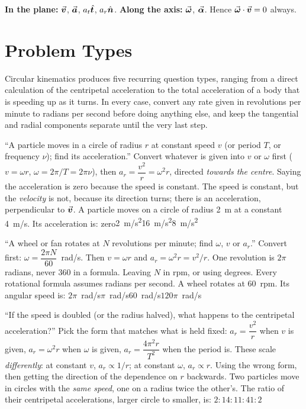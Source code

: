 \medskip
\textbf{In the plane:} $\vec{\bm{v}}$, $\vec{\bm{a}}$, $a_t\hat{\bm{t}}$, $a_r\hat{\bm{n}}$. \quad
\textbf{Along the axis:} $\vec{\bm{\omega}}$, $\vec{\bm{\alpha}}$. \quad
Hence $\vec{\bm{\omega}}\cdot\vec{\bm{v}}=0$ always.

\section{Problem Types}\label{sec:types6}
Circular kinematics produces five recurring question types, ranging from a direct calculation of the
centripetal acceleration to the total acceleration of a body that is speeding up as it turns. In every
case, convert any rate given in revolutions per minute to radians per second before doing anything else,
and keep the tangential and radial components separate until the very last step.

{``A particle moves in a circle of radius $r$ at constant speed $v$ (or period $T$, or frequency
$\nu$); find its acceleration.''}
{Convert whatever is given into $v$ or $\omega$ first ($v=\omega r$, $\omega=2\pi/T=2\pi\nu$), then
$a_r=\dfrac{v^2}{r}=\omega^2 r$, directed \emph{towards the centre}.}
{Saying the acceleration is zero because the speed is constant. The speed is constant, but the
\emph{velocity} is not, because its direction turns; there is an acceleration, perpendicular to $\vec{\bm{v}}$.}
{A particle moves on a circle of radius \SI{2}{m} at a constant \SI{4}{m/s}. Its acceleration is:}
{zero}{\SI{2}{m/s^2}}{\SI{16}{m/s^2}}{\SI{8}{m/s^2}}

{``A wheel or fan rotates at $N$ revolutions per minute; find $\omega$, $v$ or $a_r$.''}
{Convert first: $\omega=\dfrac{2\pi N}{60}$~\si{rad/s}. Then $v=\omega r$ and $a_r=\omega^2r=v^2/r$. One
revolution is $2\pi$ radians, never $360$ in a formula.}
{Leaving $N$ in rpm, or using degrees. Every rotational formula assumes radians per second.}
{A wheel rotates at \SI{60}{rpm}. Its angular speed is:}
{$2\pi$~\si{rad/s}}{$\pi$~\si{rad/s}}{\SI{60}{rad/s}}{$120\pi$~\si{rad/s}}

{``If the speed is doubled (or the radius halved), what happens to the centripetal acceleration?''}
{Pick the form that matches what is held fixed: $a_r=\dfrac{v^2}{r}$ when $v$ is given,
$a_r=\omega^2r$ when $\omega$ is given, $a_r=\dfrac{4\pi^2r}{T^2}$ when the period is. These scale
\emph{differently}: at constant $v$, $a_r\propto1/r$; at constant $\omega$, $a_r\propto r$.}
{Using the wrong form, then getting the direction of the dependence on $r$ backwards.}
{Two particles move in circles with the \emph{same speed}, one on a radius twice the other's. The ratio
of their centripetal accelerations, larger circle to smaller, is:}
{$2:1$}{$4:1$}{$1:4$}{$1:2$}

